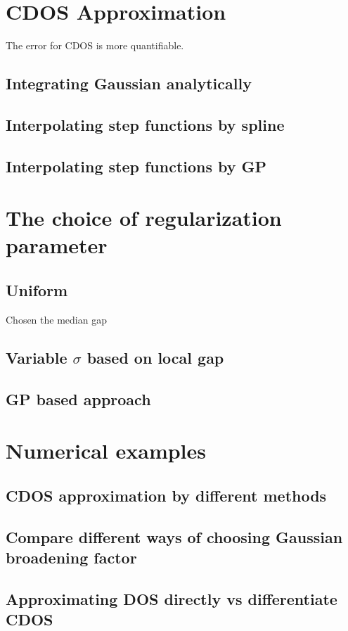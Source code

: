 \documentclass{article}
\begin{document}
\section{CDOS Approximation}
The error for CDOS is more quantifiable.
\subsection{Integrating Gaussian analytically}
\subsection{Interpolating step functions by spline}
\subsection{Interpolating step functions by GP}

\section{The choice of regularization parameter}
\subsection{Uniform}
Chosen the median gap
\subsection{Variable $\sigma$ based on local gap}
\subsection{GP based approach}

\section{Numerical examples}
\subsection{CDOS approximation by different methods}
\subsection{Compare different ways of choosing Gaussian broadening factor}
\subsection{Approximating DOS directly vs differentiate CDOS}


\end{document}

